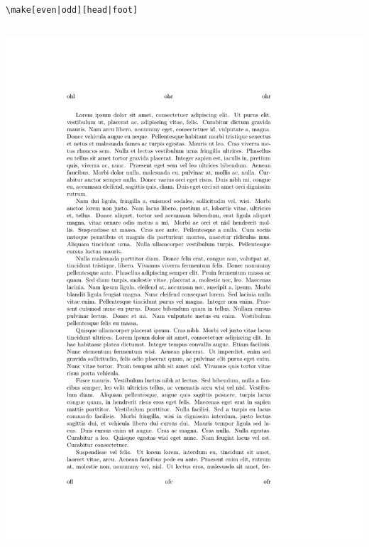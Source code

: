 \documentclass{beamer}
\begin{document}
\begin{frame}[fragile]{\texttt{\textbackslash make[even|odd][head|foot]}}
\begin{columns}
    \begin{column}{0.4\textwidth}
      \begin{overprint}
        \includegraphics[frame,width=\linewidth]{demo-hf-1}

\end{overprint}
\end{column}
\end{columns}
\end{frame}
\end{document}
